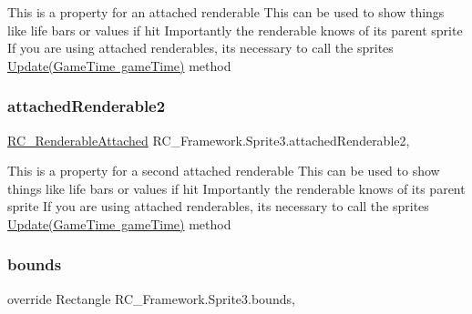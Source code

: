 This is a property for an attached renderable This can be used to show things like life bars or values if hit Importantly the renderable knows of its parent sprite If you are using attached renderables, its necessary to call the sprites \mbox{\hyperlink{class_r_c___framework_1_1_sprite3_a5473d37c4f1f44fa1685dd64c82dfd8c}{Update(\+Game\+Time game\+Time)}} method 

\mbox{\label{class_r_c___framework_1_1_sprite3_ae627737dc486e6c5a9255921e620ff26}} 
\subsubsection{\texorpdfstring{attached\+Renderable2}{attachedRenderable2}}
{\footnotesize\ttfamily \mbox{\hyperlink{class_r_c___framework_1_1_r_c___renderable_attached}{R\+C\+\_\+\+Renderable\+Attached}} R\+C\+\_\+\+Framework.\+Sprite3.\+attached\+Renderable2\hspace{0.3cm}{\ttfamily [get]}, {\ttfamily [set]}}



This is a property for a second attached renderable This can be used to show things like life bars or values if hit Importantly the renderable knows of its parent sprite If you are using attached renderables, its necessary to call the sprites \mbox{\hyperlink{class_r_c___framework_1_1_sprite3_a5473d37c4f1f44fa1685dd64c82dfd8c}{Update(\+Game\+Time game\+Time)}} method 

\mbox{\label{class_r_c___framework_1_1_sprite3_aa3f2de2ac85a5cb8f0753474ce2fc2f0}} 
\subsubsection{\texorpdfstring{bounds}{bounds}}
{\footnotesize\ttfamily override Rectangle R\+C\+\_\+\+Framework.\+Sprite3.\+bounds\hspace{0.3cm}{\ttfamily [get]}, {\ttfamily [set]}}

